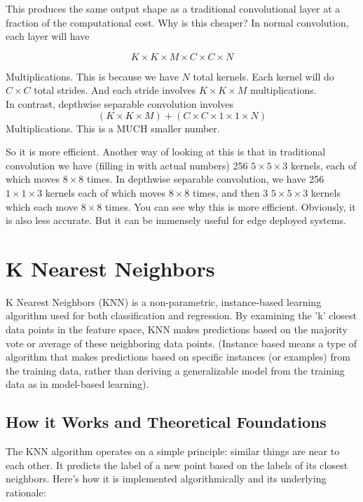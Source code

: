 \documentclass[12pt]{article}
\begin{document}
This produces the same output shape as a traditional convolutional layer at a fraction of the computational cost. Why is this cheaper? In normal convolution, each layer will have

\[K \times K \times M \times C \times C \times N\]

Multiplications. This is because we have \(N\) total kernels. Each kernel will do \(C \times C\) total strides. And each stride involves \(K \times K \times M\) multiplications. \\

In contrast, depthwise separable convolution involves
\[(K \times K \times M) + (C \times C \times 1 \times 1 \times N)\]
Multiplications. This is a MUCH smaller number.

So it is more efficient. Another way of looking at this is that in traditional convolution we have (filling in with actual numbers) 256 \(5\times5\times3\) kernels, each of which moves \(8 \times 8\) times. In depthwise separable convolution, we have 256 \(1\times1\times3\) kernels each of which moves \(8 \times 8\) times, and then 3 \(5\times5\times3\) kernels which each move \(8 \times 8\)  times. You can see why this is more efficient. Obviously, it is also less accurate. But it can be immensely useful for edge deployed systems.

\section{K Nearest Neighbors}

K Nearest Neighbors (KNN) is a non-parametric, instance-based learning algorithm used for both classification and regression. By examining the 'k' closest data points in the feature space, KNN makes predictions based on the majority vote or average of these neighboring data points. (Instance based means a type of algorithm that makes predictions based on specific instances (or examples) from the training data, rather than deriving a generalizable model from the training data as in model-based learning).

\subsection{How it Works and Theoretical Foundations}

The KNN algorithm operates on a simple principle: similar things are near to each other. It predicts the label of a new point based on the labels of its closest neighbors. Here’s how it is implemented algorithmically and its underlying rationale:
\end{document}
